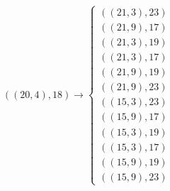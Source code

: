 \begin{minipage}{5.0cm}
\vspace{-2.8cm}


\tiny \[((20,4),18) \rightarrow \begin{cases}
((21,3),23) \\
((21,9),17) \\
((21,3),19) \\
((21,3),17)\\
((21,9),19)\\
((21,9),23)\\
((15,3),23) \\
((15,9),17) \\
((15,3),19) \\
((15,3),17)\\
((15,9),19)\\
((15,9),23)

\end{cases}\]

%
\end{minipage}
